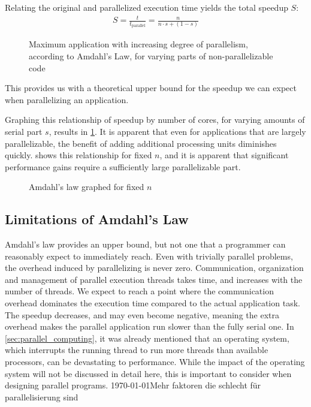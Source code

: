 \documentclass[BCOR20mm,DIV14,10pt,headinclude,footexclude,bibtotoc,liststotoc]{article}
\begin{document}
Relating the original and parallelized execution time yields the total speedup
$S$:
\begin{eqnarray}
	S = \frac{t}{t_\text{parallel}} = \frac{n}{n \cdot s + (1-s)}
\end{eqnarray}

\begin{figure}
	\centering
	
	\caption{Maximum application with increasing degree of parallelism, according to Amdahl's Law, for varying parts of non-parallelizable code}
	\label{fig:amdahl}
\end{figure}

This provides us with a theoretical upper bound for the speedup we can expect
when parallelizing an application.

Graphing this relationship of speedup by number of cores, for varying amounts of
serial part $s$, results in \cref{fig:amdahl}. It is apparent that even for
applications that are largely parallelizable, the benefit of adding additional
processing units diminishes quickly.  shows this
relationship for fixed $n$, and it is apparent that significant performance
gains require a sufficiently large parallelizable part.

\begin{figure}
	\centering
	
	\caption{Amdahl's law graphed for fixed $n$}
	\label{fig:amdahl_inverted}
\end{figure}


\subsection{Limitations of Amdahl's Law}
Amdahl's law provides an upper bound, but not one that a programmer can
reasonably expect to immediately reach. Even with trivially parallel problems,
the overhead induced by parallelizing is never zero. Communication, organization
and management of parallel execution threads takes time, and increases with the
number of threads. We expect to reach a point where the communication overhead
dominates the execution time compared to the actual application task. The
speedup decreases, and may even become negative, meaning the extra overhead
makes the parallel application run slower than the fully serial one. In
\cref{sec:parallel_computing}, it was already mentioned that an operating
system, which interrupts the running thread to run more threads than available
processors, can be devastating to performance. While the impact of the operating
system will not be discussed in detail here, this is important to consider when
designing parallel programs.
\today{Mehr faktoren die schlecht für parallelisierung sind}
\end{document}
